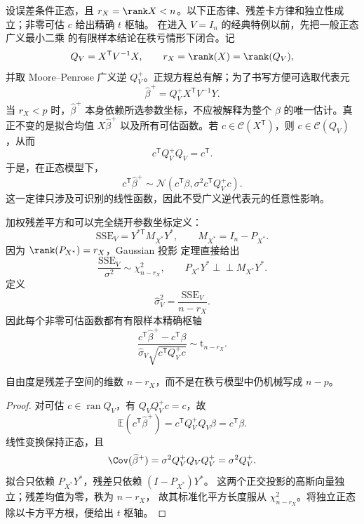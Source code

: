 \begin{theorem}
设误差条件正态，且 $r_X=\rank X<n$。以下正态律、残差卡方律和独立性成立；非零可估 $c$ 给出精确 $t$ 枢轴。
在进入 $V=I_n$ 的经典特例以前，先把一般正态 广义最小二乘 的有限样本结论在秩亏情形下闭合。记
\[
 Q_V=X^{\mathsf T}V^{-1}X,
 \qquad
 r_X=\rank(X)=\rank(Q_V),
\]
并取 Moore--Penrose 广义逆 $Q_V^+$。正规方程总有解；为了书写方便可选取代表元
\[
 \widehat\beta^+
 =Q_V^+X^{\mathsf T}V^{-1}Y.
\]
当 $r_X<p$ 时，$\widehat\beta^+$ 本身依赖所选参数坐标，不应被解释为整个 $\beta$ 的唯一估计。真正不变的是拟合均值 $X\widehat\beta^+$ 以及所有可估函数。若 $c\in\mathcal C(X^{\mathsf T})$，则 $c\in\mathcal C(Q_V)$，从而
\[
 c^{\mathsf T}Q_V^+Q_V=c^{\mathsf T}.
\]
于是，在正态模型下，
\begin{equation}\label{eq:math-stat-gls-estimable-normal-law}
 c^{\mathsf T}\widehat\beta^+
 \sim\mathcal N\!\left(
 c^{\mathsf T}\beta,
 \sigma^2c^{\mathsf T}Q_V^+c
 \right).
\end{equation}
这一定律只涉及可识别的线性函数，因此不受广义逆代表元的任意性影响。

加权残差平方和可以完全绕开参数坐标定义：
\[
 \mathrm{SSE}_V
 =Y^{*\mathsf T}M_{X^*}Y^*,
 \qquad
 M_{X^*}=I_n-P_{X^*}.
\]
因为 $\rank(P_{X^*})=r_X$，Gaussian 投影 定理直接给出
\begin{equation}\label{eq:math-stat-gls-residual-chi-square}
 \frac{\mathrm{SSE}_V}{\sigma^2}\sim\chi^2_{n-r_X},
 \qquad
 P_{X^*}Y^*\mathrel{\perp\!\!\!\perp}M_{X^*}Y^*.
\end{equation}
定义
\[
 \widehat\sigma_V^2=\frac{\mathrm{SSE}_V}{n-r_X}.
\]
因此每个非零可估函数都有有限样本精确枢轴
\begin{equation}\label{eq:math-stat-gls-estimable-t}
 \frac{c^{\mathsf T}\widehat\beta^+-c^{\mathsf T}\beta}
 {\widehat\sigma_V\sqrt{c^{\mathsf T}Q_V^+c}}
 \sim\mathrm t_{n-r_X}.
\end{equation}

自由度是残差子空间的维数 $n-r_X$，而不是在秩亏模型中仍机械写成 $n-p$。
\end{theorem}
\begin{proof}
对可估 $c\in\operatorname{ran}Q_V$，有 $Q_VQ_V^+c=c$，故
\[
 \mathbb E(c^{\mathsf T}\widehat\beta^+)=c^{\mathsf T}Q_V^+Q_V\beta=c^{\mathsf T}\beta.
\]
线性变换保持正态，且
\[
 \Cov(\widehat\beta^+)=\sigma^2Q_V^+Q_VQ_V^+=\sigma^2Q_V^+.
\]
拟合只依赖 $P_{X^*}Y^*$，残差只依赖 $(I-P_{X^*})Y^*$。
这两个正交投影的高斯向量独立；残差均值为零，秩为 $n-r_X$，
故其标准化平方长度服从 $\chi^2_{n-r_X}$。将独立正态除以卡方平方根，便给出 $t$ 枢轴。
\end{proof}


